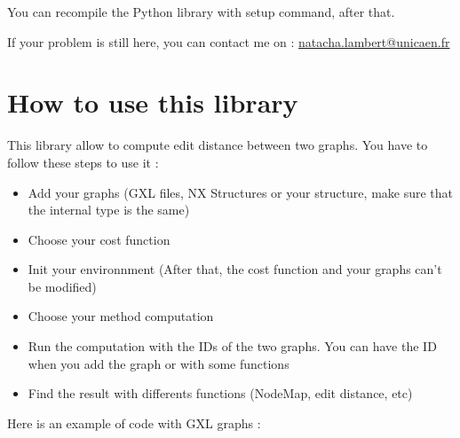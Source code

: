 \documentclass[letterpaper,10pt,english]{sphinxmanual}
\begin{document}
You can recompile the Python library with setup command, after that.

If your problem is still here, you can contact me on : \href{mailto:natacha.lambert@unicaen.fr}{natacha.lambert@unicaen.fr}


\section{How to use this library}
\label{readme:how-to-use-this-library}
This library allow to compute edit distance between two graphs. You have to follow these steps to use it :
\begin{itemize}
\item {} 
Add your graphs (GXL files, NX Structures or your structure, make sure that the internal type is the same)

\item {} 
Choose your cost function

\item {} 
Init your environnment (After that, the cost function and your graphs can't be modified)

\item {} 
Choose your method computation

\item {} 
Run the computation with the IDs of the two graphs. You can have the ID when you add the graph or with some functions

\item {} 
Find the result with differents functions (NodeMap, edit distance, etc)

\end{itemize}

Here is an example of code with GXL graphs :
\end{document}
